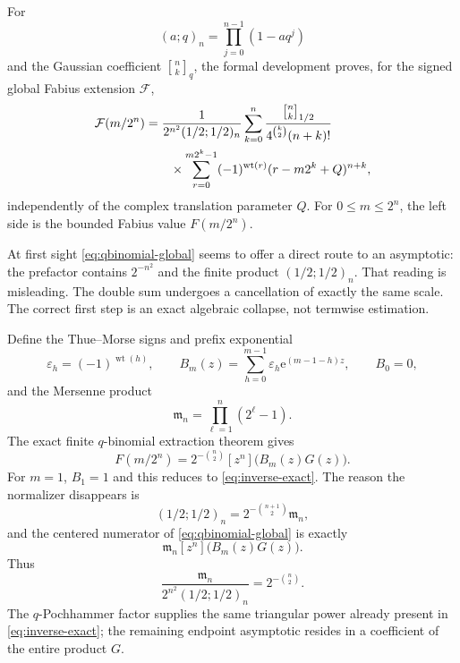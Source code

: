 \documentclass[11pt,oneside]{article}
\theoremstyle{definition}
\theoremstyle{remark}
\newcommand{\wt}{\operatorname{wt}}
\newcommand{\e}{\mathrm e}
\newcommand{\qbinom}[3]{\genfrac{[}{]}{0pt}{}{#1}{#2}_{#3}}
\newcommand{\TM}{\varepsilon}
\begin{document}
For
\begin{equation}
 (a;q)_n=\prod_{j=0}^{n-1}(1-aq^j)
\label{eq:qpochhammer}
\end{equation}
and the Gaussian coefficient $\qbinom nkq$, the formal development proves, for the signed global Fabius extension $\mathcal F$,
\begin{align}
 \mathcal F(m/2^n)
 &=\frac{1}{2^{n^2}(1/2;1/2)_n}
 \sum_{k=0}^{n}
 \frac{\qbinom nk{1/2}}
 {4^{\binom k2}(n+k)!}                                    \notag\\
 &\qquad\times
 \sum_{r=0}^{m2^k-1}(-1)^{\wt(r)}
 (r-m2^k+Q)^{n+k},
\label{eq:qbinomial-global}
\end{align}
independently of the complex translation parameter $Q$.  For
$0\le m\le2^n$, the left side is the bounded Fabius value $F(m/2^n)$.

At first sight \eqref{eq:qbinomial-global} seems to offer a direct route to an asymptotic: the prefactor contains $2^{-n^2}$ and the finite product
$(1/2;1/2)_n$.  That reading is misleading.  The double sum undergoes a cancellation of exactly the same scale.  The correct first step is an exact algebraic collapse, not termwise estimation.

Define the Thue--Morse signs and prefix exponential
\begin{equation}
 \TM_h=(-1)^{\wt(h)},
 \qquad
 B_m(z)=\sum_{h=0}^{m-1}\TM_h\e^{(m-1-h)z},
 \qquad B_0=0,
\label{eq:Bm-def}
\end{equation}
and the Mersenne product
\begin{equation}
 \mathfrak m_n=\prod_{\ell=1}^n(2^\ell-1).
\label{eq:mersenne-product}
\end{equation}
The exact finite $q$-binomial extraction theorem gives
\begin{equation}
 \boxed{
 F(m/2^n)=2^{-\binom n2}[z^n]\bigl(B_m(z)G(z)\bigr).}
\label{eq:prefix-coefficient}
\end{equation}
For $m=1$, $B_1=1$ and this reduces to \eqref{eq:inverse-exact}.  The reason the normalizer disappears is
\begin{equation}
 (1/2;1/2)_n=2^{-\binom{n+1}{2}}\mathfrak m_n,
\label{eq:q-mersenne}
\end{equation}
and the centered numerator of \eqref{eq:qbinomial-global} is exactly
\begin{equation}
 \mathfrak m_n[z^n]\bigl(B_m(z)G(z)\bigr).
\label{eq:q-numerator-collapse}
\end{equation}
Thus
\begin{equation}
 \frac{\mathfrak m_n}{2^{n^2}(1/2;1/2)_n}
 =2^{-\binom n2}.
\label{eq:q-normalizer-cancel}
\end{equation}
The $q$-Pochhammer factor supplies the same triangular power already present in
\eqref{eq:inverse-exact}; the remaining endpoint asymptotic resides in a coefficient of the entire product $G$.
\end{document}

